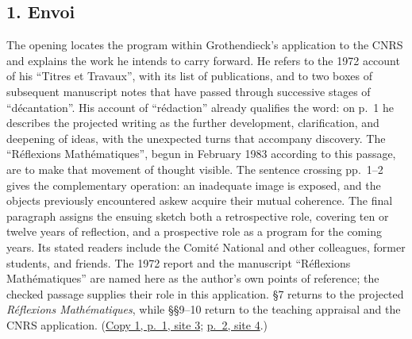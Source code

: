 \subsection*{1. Envoi}
The opening locates the program within Grothendieck's application to the
CNRS and explains the work he intends to carry forward. He refers to the
1972 account of his ``Titres et Travaux'', with its list of publications,
and to two boxes of subsequent manuscript notes that have passed through
successive stages of ``décantation''. His account of ``rédaction'' already
qualifies the word: on p.~1 he describes the projected writing as the
further development, clarification, and deepening of ideas, with the
unexpected turns that accompany discovery. The ``Réflexions Mathématiques'',
begun in February 1983 according to this passage, are to make that movement
of thought visible. The sentence crossing pp.~1--2 gives the complementary
operation: an inadequate image is exposed, and the objects previously
encountered askew acquire their mutual coherence. The final paragraph
assigns the ensuing sketch both a retrospective role, covering ten or
twelve years of reflection, and a prospective role as a program for the
coming years. Its stated readers include the Comité National and other
colleagues, former students, and friends. The 1972 report and the manuscript
``Réflexions Mathématiques'' are named here as the author's own points of
reference; the checked passage supplies their role in this application.
\S7 returns to the projected \emph{Réflexions Mathématiques}, while
\S\S9--10 return to the teaching appraisal and the CNRS application.
(\href{https://grothendieck.umontpellier.fr/web/viewer.html?file=../119.pdf\#page=4}{Copy 1, p.~1, site 3};
\href{https://grothendieck.umontpellier.fr/web/viewer.html?file=../119.pdf\#page=5}{p.~2, site 4}.)

